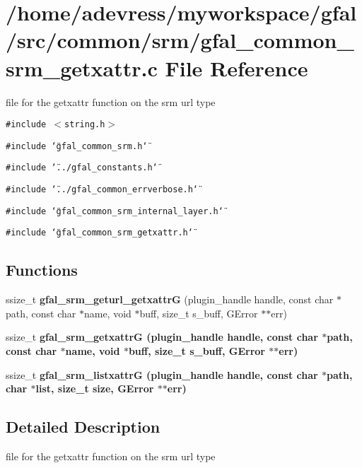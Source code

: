 \section{/home/adevress/myworkspace/gfal/src/common/srm/gfal\_\-common\_\-srm\_\-getxattr.c File Reference}
\label{gfal__common__srm__getxattr_8c}
file for the getxattr function on the srm url type 

{\tt \#include $<$string.h$>$}\par
{\tt \#include \char`\"{}gfal\_\-common\_\-srm.h\char`\"{}}\par
{\tt \#include \char`\"{}../gfal\_\-constants.h\char`\"{}}\par
{\tt \#include \char`\"{}../gfal\_\-common\_\-errverbose.h\char`\"{}}\par
{\tt \#include \char`\"{}gfal\_\-common\_\-srm\_\-internal\_\-layer.h\char`\"{}}\par
{\tt \#include \char`\"{}gfal\_\-common\_\-srm\_\-getxattr.h\char`\"{}}\par
\subsection*{Functions}
\begin{CompactItemize}
\item 
ssize\_\-t \textbf{gfal\_\-srm\_\-geturl\_\-getxattr\-G} (plugin\_\-handle handle, const char $\ast$path, const char $\ast$name, void $\ast$buff, size\_\-t s\_\-buff, GError $\ast$$\ast$err)\label{gfal__common__srm__getxattr_8c_2707a267e7aef996e826c7bf78bf1f2c}

\item 
ssize\_\-t \bf{gfal\_\-srm\_\-getxattr\-G} (plugin\_\-handle handle, const char $\ast$path, const char $\ast$name, void $\ast$buff, size\_\-t s\_\-buff, GError $\ast$$\ast$err)
\item 
ssize\_\-t \bf{gfal\_\-srm\_\-listxattr\-G} (plugin\_\-handle handle, const char $\ast$path, char $\ast$list, size\_\-t size, GError $\ast$$\ast$err)
\end{CompactItemize}


\subsection{Detailed Description}
file for the getxattr function on the srm url type 


